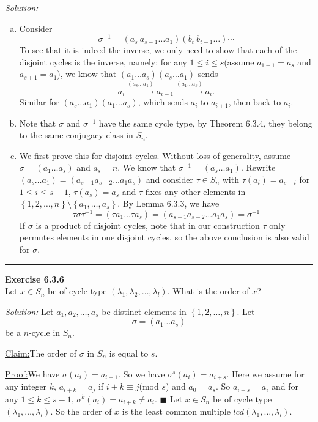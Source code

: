 \documentclass[a4paper, 12pt]{article}
\newenvironment{problem}[2][Exercise]
    { \begin{mdframed}[backgroundcolor=gray!20] \textbf{#1 #2} \\}
    {  \end{mdframed}}
\newenvironment{solution}
    {\textit{Solution:}}
    {}
\newenvironment{claim}[1]{\par\noindent\underline{Claim:}\space#1}{}
\newenvironment{claimproof}[1]{\par\noindent\underline{Proof:}\space#1}{\hfill $\blacksquare$}
\begin{document}
\begin{solution}
\begin{enumerate}[(a)]
\item Consider 
\[\sigma^{-1}=(a_s\ a_{s-1}\ldots a_1)(b_t\  b_{t-1}\ldots)\cdots\]
To see that it is indeed the inverse, we only need to show that each of the disjoint cycles is the inverse, namely: for any \(1\leq i\leq s\)(assume \(a_{1-1}=a_s\) and \(a_{s+1}=a_1\)), we know that \((a_1\ldots a_s)(a_s\ldots a_1)\) sends 
\[a_i\xrightarrow{(a_s\ldots a_1)}a_{i-1}\xrightarrow{(a_1\ldots a_s)}a_i.\]
Similar for \((a_s\ldots a_1)(a_1\ldots a_s)\), which sends \(a_i\) to \(a_{i+1}\), then back to \(a_i\).
\item Note that \(\sigma\) and \(\sigma^{-1}\) have the same cycle type, by Theorem 6.3.4, they belong to the same conjugacy class in \(S_n\).
\item We first prove this for disjoint cycles. Without loss of generality, assume \(\sigma=(a_1\ldots a_s)\) and \(a_s=n\). We know that \(\sigma^{-1}=(a_s\ldots a_1)\). Rewrite 
\((a_s\ldots a_1)=(a_{s-1} a_{s-2}\ldots a_1 a_s)\) and consider \(\tau\in S_n\) with \(\tau(a_i)=a_{s-i}\) for \(1\leq i\leq s-1\), \(\tau(a_s)=a_s\) and \(\tau\) fixes any other elements in \(\left\{ 1,2,\ldots,n \right\}\setminus \left\{ a_1,\ldots,a_s\right\}\). By 
Lemma 6.3.3, we have 
\[\tau\sigma\tau^{-1}=(\tau a_1\ldots \tau a_s)=(a_{s-1} a_{s-2}\ldots a_1 a_s)=\sigma^{-1}\]
If \(\sigma\) is a product of disjoint cycles, note that in our construction \(\tau\) only permutes elements in one disjoint cycles, so the above conclusion is also valid for \(\sigma\).
\end{enumerate}
\end{solution}

\noindent\rule{7in}{2.8pt}
\begin{problem}{6.3.6}
Let \(x\in S_n\) be of cycle type \((\lambda_1,\lambda_2,\ldots,\lambda_l)\). What is the order of \(x\)?
\end{problem}
\begin{solution}
Let \(a_1,a_2,\ldots, a_s\) be distinct elements in \(\left\{ 1,2,\ldots,n \right\}\). Let 
\[\sigma=(a_1\ldots a_s)\]
be a \(n\)-cycle in \(S_n\). 
\begin{claim}
The order of \(\sigma\) in \(S_n\) is equal to \(s\).
\end{claim} 
\begin{claimproof}
We have \(\sigma(a_i)=a_{i+1}\). So we have \(\sigma^s(a_i)=a_{i+s}\). Here we assume for any integer \(k\), \(a_{i+k}=a_j\) if \(i+k\equiv j\)(mod \(s\)) and \(a_0=a_s\). So \(a_{i+s}=a_i\) and 
for any \(1\leq k\leq s-1\), \(\sigma^k(a_i)=a_{i+k}\neq a_i\). 
\end{claimproof} 
Let \(x\in S_n\) be of cycle type \((\lambda_1,\ldots,\lambda_l)\). So the order of \(x\) is the least common multiple \(lcd(\lambda_1,\ldots,\lambda_l)\). 
\end{solution}
\end{document}
